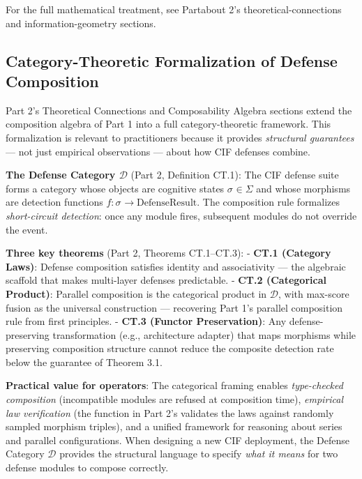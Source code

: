 \documentclass[
]{article}
\newcommand{\calD}{\mathcal{D}}
\newcommand{\cogstate}[1]{\sigma_{#1}}
\begin{document}
For the full mathematical treatment, see Partabout 2's
theoretical-connections and information-geometry sections.

\subsection{Category-Theoretic Formalization of Defense
Composition}\label{sec:category-theory-crossref}

Part 2's Theoretical Connections and Composability Algebra sections
extend the composition algebra of Part 1 into a full category-theoretic
framework. This formalization is relevant to practitioners because it
provides \emph{structural guarantees} --- not just empirical
observations --- about how CIF defenses combine.

\textbf{The Defense Category \(\calD\)} (Part 2, Definition CT.1): The
CIF defense suite forms a category whose objects are cognitive states
\(\cogstate{} \in \Sigma\) and whose morphisms are detection functions
\(f : \cogstate{} \to \mathrm{DefenseResult}\). The composition rule
formalizes \emph{short-circuit detection}: once any module fires,
subsequent modules do not override the event.

\textbf{Three key theorems} (Part 2, Theorems CT.1--CT.3): -
\textbf{CT.1 (Category Laws)}: Defense composition satisfies identity
and associativity --- the algebraic scaffold that makes multi-layer
defenses predictable. - \textbf{CT.2 (Categorical Product)}: Parallel
composition is the categorical product in \(\calD\), with max-score
fusion as the universal construction --- recovering Part 1's parallel
composition rule from first principles. - \textbf{CT.3 (Functor
Preservation)}: Any defense-preserving transformation (e.g.,
architecture adapter) that maps morphisms while preserving composition
structure cannot reduce the composite detection rate below the guarantee
of Theorem 3.1.

\textbf{Practical value for operators}: The categorical framing enables
\emph{type-checked composition} (incompatible modules are refused at
composition time), \emph{empirical law verification} (the
 function in Part 2's
 validates the laws against
randomly sampled morphism triples), and a unified framework for
reasoning about series and parallel configurations. When designing a new
CIF deployment, the Defense Category \(\calD\) provides the structural
language to specify \emph{what it means} for two defense modules to
compose correctly.
\end{document}
